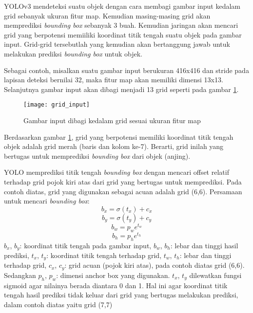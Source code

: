 \documentclass[../thesis.tex]{subfiles}
\begin{document}
YOLOv3 mendeteksi suatu objek dengan cara membagi gambar input kedalam grid sebanyak ukuran fitur map. Kemudian masing-masing grid akan memprediksi \textit{bounding box} sebanyak 3 buah.
Kemudian jaringan akan mencari grid yang berpotensi memiiliki koordinat titik tengah suatu objek pada gambar input. Grid-grid tersebutlah yang kemudian akan bertanggung jawab untuk melakukan prediksi \textit{bounding box} untuk objek.

Sebagai contoh, misalkan suatu gambar input berukuran 416x416 dan stride pada lapisan deteksi bernilai 32, maka fitur map akan memiliki dimensi 13x13. Selanjutnya gambar input akan dibagi menjadi 13 grid seperti pada gambar \ref{grid_YOLO}.
\begin{figure}
	\centering
	\texttt{[image: grid\_input]}
	\caption{Gambar input dibagi kedalam grid sesuai ukuran fitur map}
	\label{grid_YOLO}
\end{figure}
Berdasarkan gambar \ref{grid_YOLO}, grid yang berpotensi memiliki koordinat titik tengah objek adalah grid merah (baris dan kolom ke-7). Berarti, grid inilah yang bertugas untuk memprediksi \textit{bounding box} dari objek (anjing). 

YOLO memprediksi titik tengah \textit{bounding box} dengan mencari offset relatif terhadap grid pojok kiri atas dari grid yang bertugas untuk memprediksi. Pada contoh diatas, grid yang digunakan sebagai acuan adalah grid (6,6).
Persamaan untuk mencari \textit{bounding box}:
\begin{equation} \label{bx_bb}
	b_{x} = \sigma(t_{x}) + c_x
   \end{equation}
\begin{equation} \label{by_bb}
	b_{y} = \sigma(t_{y}) + c_y
\end{equation}
\begin{equation} \label{bw_bb}
	b_{w} = p_{w}e^{t_w}
\end{equation}
\begin{equation} \label{bh_bb}
	b_{h} = p_{h}e^{t_h}
\end{equation}
$b_x$, $b_y$: koordinat titik tengah pada gambar input, $b_w$, $b_h$: lebar dan tinggi hasil prediksi, $t_x$, $t_y$: koordinat titik tengah terhadap grid, $t_w$, $t_h$: lebar dan tinggi terhadap grid, $c_x$, $c_y$: grid acuan (pojok kiri atas), pada contoh diatas grid (6,6). Sedangkan $p_h$, $p_w$: dimensi anchor box yang digunakan. 
$t_x$, $t_y$ dilewatkan fungsi sigmoid agar nilainya berada diantara 0 dan 1. Hal ini agar koordinat titik tengah hasil prediksi tidak keluar dari grid yang bertugas melakukan prediksi, dalam contoh diatas yaitu grid (7,7)
\end{document}
